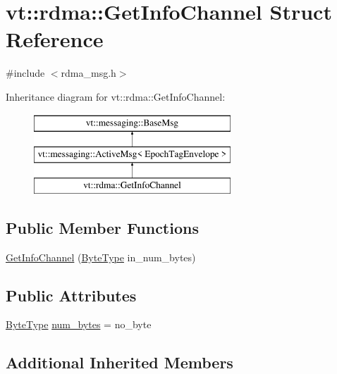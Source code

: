 \hypertarget{structvt_1_1rdma_1_1_get_info_channel}{}\section{vt\+:\+:rdma\+:\+:Get\+Info\+Channel Struct Reference}
\label{structvt_1_1rdma_1_1_get_info_channel}


{\ttfamily \#include $<$rdma\+\_\+msg.\+h$>$}

Inheritance diagram for vt\+:\+:rdma\+:\+:Get\+Info\+Channel\+:\begin{figure}[H]
\begin{center}
\leavevmode
\includegraphics[height=3.000000cm]{structvt_1_1rdma_1_1_get_info_channel}
\end{center}
\end{figure}
\subsection*{Public Member Functions}
\begin{DoxyCompactItemize}
\item 
\hyperlink{structvt_1_1rdma_1_1_get_info_channel_ad3a1b099ae810ad811012ac973f525b2}{Get\+Info\+Channel} (\hyperlink{namespacevt_aab8d55968084610ce3b17057981e9300}{Byte\+Type} in\+\_\+num\+\_\+bytes)
\end{DoxyCompactItemize}
\subsection*{Public Attributes}
\begin{DoxyCompactItemize}
\item 
\hyperlink{namespacevt_aab8d55968084610ce3b17057981e9300}{Byte\+Type} \hyperlink{structvt_1_1rdma_1_1_get_info_channel_a70892023d33a2578d7888b7652e643ea}{num\+\_\+bytes} = no\+\_\+byte
\end{DoxyCompactItemize}
\subsection*{Additional Inherited Members}



